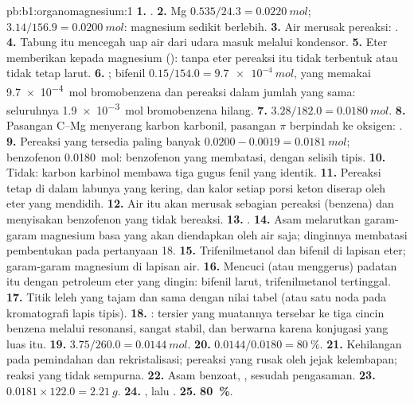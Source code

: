 \begin{solution}{pb:b1:organomagnesium:1}
\textbf{1.} .
\textbf{2.} Mg $0.535/24.3 = \qty{0.0220}{mol}$;  $3.14/156.9 =
\qty{0.0200}{mol}$: magnesium sedikit berlebih.
\textbf{3.} Air merusak pereaksi: .
\textbf{4.} Tabung itu mencegah uap air dari udara masuk melalui
kondensor.
\textbf{5.} Eter memberikan  kepada magnesium
(): tanpa eter pereaksi itu tidak terbentuk atau tidak tetap
larut.
\textbf{6.} ; bifenil
$0.15/154.0 = \qty{9.7e-4}{mol}$, yang memakai \qty{9.7e-4}{mol}
bromobenzena dan pereaksi dalam jumlah yang sama: seluruhnya
\qty{1.9e-3}{mol} bromobenzena hilang.
\textbf{7.} $3.28/182.0 = \qty{0.0180}{mol}$.
\textbf{8.} Pasangan C--Mg menyerang karbon karbonil, pasangan $\pi$
berpindah ke oksigen:  .
\textbf{9.} Pereaksi yang tersedia paling banyak
$0.0200 - 0.0019 = \qty{0.0181}{mol}$; benzofenon \qty{0.0180}{mol}:
benzofenon yang membatasi, dengan selisih tipis.
\textbf{10.} Tidak: karbon karbinol membawa tiga gugus fenil yang
identik.
\textbf{11.} Pereaksi tetap di dalam labunya yang kering, dan kalor setiap
porsi keton diserap oleh eter yang mendidih.
\textbf{12.} Air itu akan merusak sebagian pereaksi (benzena) dan
menyisakan benzofenon yang tidak bereaksi.
\textbf{13.} .
\textbf{14.} Asam melarutkan garam-garam magnesium basa yang akan
diendapkan oleh air saja; dinginnya membatasi pembentukan 
pada pertanyaan 18.
\textbf{15.} Trifenilmetanol dan bifenil di lapisan eter; garam-garam
magnesium di lapisan air.
\textbf{16.} Mencuci (atau menggerus) padatan itu dengan petroleum eter
yang dingin: bifenil larut, trifenilmetanol tertinggal.
\textbf{17.} Titik leleh yang tajam dan sama dengan nilai tabel (atau satu
noda pada kromatografi lapis tipis).
\textbf{18.} :  tersier
yang muatannya tersebar ke tiga cincin benzena melalui resonansi, sangat
stabil, dan berwarna karena konjugasi yang luas itu.
\textbf{19.} $3.75/260.0 = \qty{0.0144}{mol}$.
\textbf{20.} $0.0144/0.0180 = \qty{80}{\percent}$.
\textbf{21.} Kehilangan pada pemindahan dan rekristalisasi; pereaksi yang
rusak oleh jejak kelembapan; reaksi yang tidak sempurna.
\textbf{22.} Asam benzoat, , sesudah pengasaman.
\textbf{23.} $0.0181 \times 122.0 = \qty{2.21}{g}$.
\textbf{24.} , lalu
.
\textbf{25.} \textbf{\qty{80}{\percent}}.
\end{solution}
